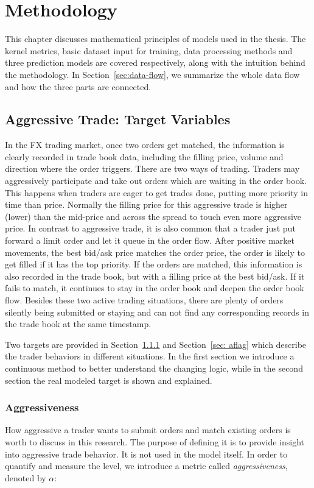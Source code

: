 \chapter{Methodology}\label{chapter:methodology}


This chapter discusses mathematical principles of models used in the thesis. The kernel metrics, basic dataset input for training, data processing methods and three prediction models are covered respectively, along with the intuition behind the methodology. In Section~\ref{sec:data-flow}, we summarize the whole data flow and how the three parts are connected. 

\section{Aggressive Trade: Target Variables}
In the FX trading market, once two orders get matched, the information is clearly recorded in trade book data, including the filling price, volume and direction where the order triggers. There are two ways of trading. Traders may aggressively participate and take out orders which are waiting in the order book. This happens when traders are eager to get trades done, putting more priority in time than price. Normally the filling price for this aggressive trade is higher (lower) than the mid-price and across the spread to touch even more aggressive price. In contrast to aggressive trade, it is also common that a trader just put forward a limit order and let it queue in the order flow. After positive market movements, the best bid/ask price matches the order price, the order is likely to get filled if it has the top priority. If the orders are matched, this information is also recorded in the trade book, but with a filling price at the best bid/ask. If it fails to match, it continues to stay in the order book and deepen the order book flow. Besides these two active trading situations, there are plenty of orders silently being submitted or staying and can not find any corresponding records in the trade book at the same timestamp. 

Two targets are provided in Section~\ref{sec: alpha} and Section~\ref{sec: aflag} which describe the trader behaviors in different situations. In the first section we introduce a continuous method to better understand the changing logic, while in the second section the real modeled target is shown and explained.

\subsection{Aggressiveness} \label{sec: alpha}
How aggressive a trader wants to submit orders and match existing orders is worth to discuss in this research. The purpose of defining it is to provide insight into aggressive trade behavior. It is not used in the model itself. In order to quantify and measure the level, we introduce a metric called \textit{aggressiveness}, denoted by $\alpha$:

